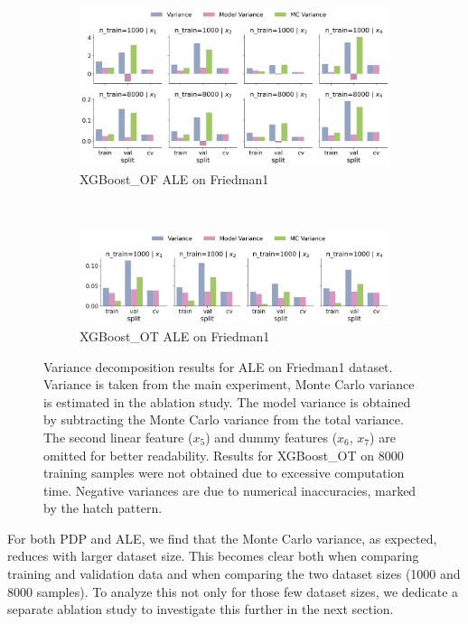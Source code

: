 \documentclass[runningheads]{llncs}
\begin{document}
\begin{figure}[htbp]
    \centering
    \begin{subfigure}[b]{0.75\textwidth}
        \includegraphics[width=\textwidth]{img/variance_decomposition_ale_XGBoost_OF.png}
        \caption{XGBoost\_OF ALE on Friedman1}
    \end{subfigure}
    \\[10pt]
    \vfill
    \begin{subfigure}[b]{0.75\textwidth}
        \includegraphics[width=\textwidth]{img/variance_decomposition_ale_XGBoost_OT.png}
        \caption{XGBoost\_OT ALE on Friedman1}
    \end{subfigure}
    \caption{Variance decomposition results for ALE on Friedman1 dataset. Variance is taken from the
        main experiment, Monte Carlo variance is estimated in the ablation study. The model variance is
        obtained by subtracting the Monte Carlo variance from the total variance. The second linear feature
        ($x_5$) and dummy features ($x_6$, $x_7$) are omitted for better readability. Results for XGBoost\_OT
        on 8000 training samples were not obtained due to excessive computation time. Negative variances are
        due to numerical inaccuracies, marked by the hatch pattern.}
    \label{fig:ale-variance-decomp}  %
\end{figure}

For both PDP and ALE, we find that the Monte Carlo variance, as expected,
reduces with larger dataset size. This becomes clear both when comparing
training and validation data and when comparing the two dataset sizes (1000 and
8000 samples). To analyze this not only for those few dataset sizes, we
dedicate a separate ablation study to investigate this further in the next
section.
\end{document}
